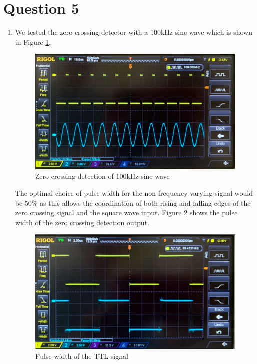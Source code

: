\documentclass[11pt]{article}
\begin{document}
\section*{Question 5}
\begin{enumerate}[label=(\alph*)]
\item %
We tested the zero crossing detector with a 100kHz sine wave which is shown in Figure \ref{fig:W3Q5a}. 
\begin{figure}[H]
    \centering
    \includegraphics[width=15cm]{W3Q5a.jpg}
    \caption{Zero crossing detection of 100kHz sine wave}
    \label{fig:W3Q5a}
\end{figure}
The optimal choice of pulse width for the non frequency varying signal would be 50\% as this allows the coordination of both rising and falling edges of the zero crossing signal and the square wave input. Figure \ref{fig:W3Q5a_} shows the pulse width of the zero crossing detection output. 
\begin{figure}[H]
    \centering
    \includegraphics[width=15cm]{W3Q5a_.jpg}
    \caption{Pulse width of the TTL signal}
    \label{fig:W3Q5a_}
\end{figure}

\end{enumerate}
\end{document}
